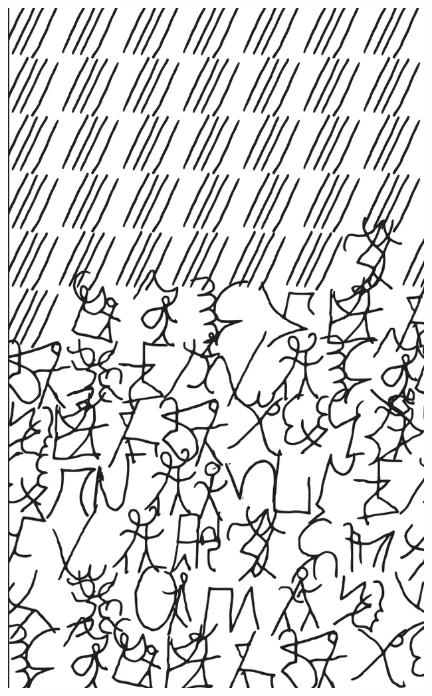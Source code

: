 \makeatletter\@openrightfalse
\movetooddpage
\begin{absolutelynopagebreak}
\begin{vplace}
\begin{figure}[H]
\begin{adjustwidth}{-0.99cm}{}
  \centering
  \vspace*{-1.77cm}
  \includegraphics[width=110mm]{./imgs/img5.pdf}  
  \hfill
\end{adjustwidth}

\thispagestyle{empty}

\end{figure}
\end{vplace}

\end{absolutelynopagebreak}

